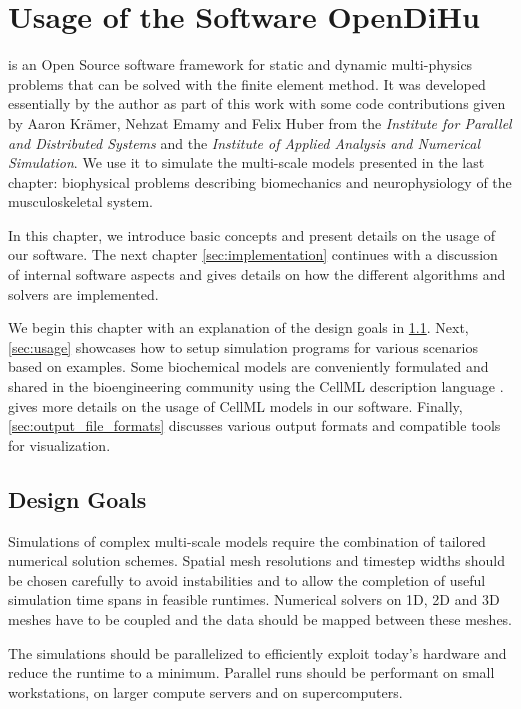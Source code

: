 \chapter{Usage of the Software OpenDiHu}\label{chap:usage}

\Opendihu{} is an Open Source software framework for static and dynamic multi-physics problems that can be solved with the finite element method. 
It was developed essentially by the author as part of this work with some code contributions given by Aaron Krämer, Nehzat Emamy and Felix Huber from the \emph{Institute for Parallel and Distributed Systems} and the \emph{Institute of Applied Analysis and Numerical Simulation}.
We use it to simulate the multi-scale models presented in the last chapter: biophysical problems describing biomechanics and neurophysiology of the musculoskeletal system.

In this chapter, we introduce basic concepts and present details on the usage of our software. The next chapter \cref{sec:implementation} continues with a discussion of internal software aspects and gives details on how the different algorithms and solvers are implemented.

We begin this chapter with an explanation of the design goals in \cref{sec:design_goals}. Next, \cref{sec:usage} showcases how to setup simulation programs for various scenarios based on examples. Some biochemical models are conveniently formulated and shared in the bioengineering community using the CellML description language \cite{Cellml2003}.  gives more details on the usage of CellML models in our software. Finally, \cref{sec:output_file_formats} discusses various output formats and compatible tools for visualization.

\section{Design Goals}\label{sec:design_goals}

Simulations of complex multi-scale models require the combination of tailored numerical solution schemes. Spatial mesh resolutions and timestep widths should be chosen carefully to avoid instabilities and to allow the completion of useful simulation time spans in feasible runtimes.
Numerical solvers on 1D, 2D and 3D meshes have to be coupled and the data should be mapped between these meshes. 

The simulations should be parallelized to efficiently exploit today's hardware and reduce the runtime to a minimum. Parallel runs should be performant on small workstations, on larger compute servers and on supercomputers. 

